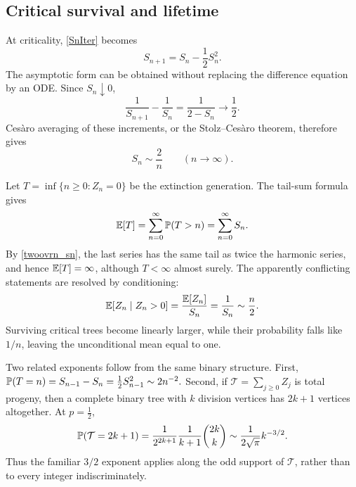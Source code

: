 \subsection{Critical survival and lifetime}
\label{sec:criticalcase}

At criticality, \eqref{SnIter} becomes
\begin{equation}
  S_{n+1}=S_n-\frac12S_n^2.
  \label{eq:critical-survival-recurrence}
\end{equation}
The asymptotic form can be obtained without replacing the difference equation by
an ODE.  Since \(S_n\downarrow0\),
\begin{equation}
  \frac{1}{S_{n+1}}-\frac{1}{S_n}
  =\frac{1}{2-S_n}\longrightarrow\frac12.
  \label{eq:critical-reciprocal-increment}
\end{equation}
Ces\`aro averaging of these increments, or the Stolz--Ces\`aro theorem, therefore
gives
\begin{equation}
  S_n\sim\frac{2}{n}
  \qquad (n\to\infty).
  \label{twoovrn_sn}
\end{equation}

Let \(T=\inf\{n\geq0:Z_n=0\}\) be the extinction generation.  The tail-sum
formula gives
\begin{equation}
  \mathbb{E}[T]
  =\sum_{n=0}^{\infty}\mathbb{P}(T>n)
  =\sum_{n=0}^{\infty}S_n.
  \label{eq:ETsumSn}
\end{equation}
By \eqref{twoovrn_sn}, the last series has the same tail as twice the harmonic
series, and hence \(\mathbb{E}[T]=\infty\), although \(T<\infty\) almost surely.  The
apparently conflicting statements are resolved by conditioning:
\begin{equation}
  \mathbb{E}[Z_n\mid Z_n>0]=\frac{\mathbb{E}[Z_n]}{S_n}
  =\frac{1}{S_n}\sim\frac{n}{2}.
  \label{eq:critical-conditional-mean}
\end{equation}
Surviving critical trees become linearly larger, while their probability falls
like \(1/n\), leaving the unconditional mean equal to one.

Two related exponents follow from the same binary structure.  First,
\(
  \mathbb{P}(T=n)=S_{n-1}-S_n=\tfrac12S_{n-1}^2\sim2n^{-2}.
\)
Second, if
\(\mathcal T=\sum_{j\geq0}Z_j\) is total progeny, then a complete binary tree with
\(k\) division vertices has \(2k+1\) vertices altogether.  At \(p=\tfrac12\),
\begin{equation}
  \mathbb{P}(\mathcal T=2k+1)
  =\frac{1}{2^{2k+1}}\frac{1}{k+1}\binom{2k}{k}
  \sim \frac{1}{2\sqrt{\pi}}k^{-3/2}.
  \label{eq:critical-total-progeny}
\end{equation}
Thus the familiar \(3/2\) exponent applies along the odd support of
\(\mathcal T\), rather than to every integer indiscriminately.

